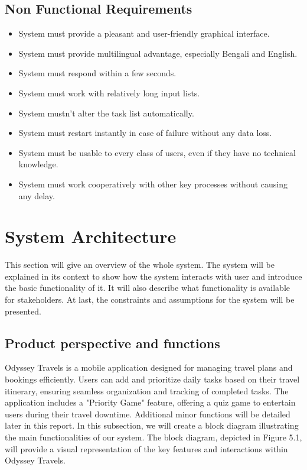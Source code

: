 \documentclass{scrreprt}
\begin{document}
\section {Non Functional Requirements}
\begin{itemize}
    \item System must provide a pleasant and user-friendly graphical interface.
    \item System must provide multilingual advantage, especially Bengali and English.
    \item System must respond within a few seconds.
    \item System must work with relatively long input lists.
    \item System mustn’t alter the task list automatically.
    \item System must restart instantly in case of failure without any data loss.
    \item System must be usable to every class of users, even if they have no technical knowledge.
    \item System must work cooperatively with other key processes without causing any delay.
\end{itemize}

\chapter {System Architecture}
This section will give an overview of the whole system. The system will be explained in its context
to show how the system interacts with user and introduce the basic functionality of it. It will also
describe what functionality is available for stakeholders. At last, the constraints and assumptions for
the system will be presented.

\section {Product perspective and functions}
Odyssey Travels is a mobile application designed for managing travel plans and bookings efficiently. Users can add and prioritize daily tasks based on their travel itinerary, ensuring seamless organization and tracking of completed tasks. The application includes a "Priority Game" feature, offering a quiz game to entertain users during their travel downtime. Additional minor functions will be detailed later in this report.
In this subsection, we will create a block diagram illustrating the main functionalities of our system. The block diagram, depicted in Figure 5.1, will provide a visual representation of the key features and interactions within Odyssey Travels.
\end{document}
